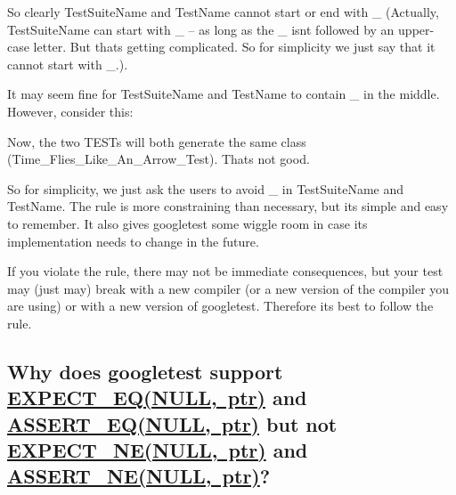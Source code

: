 So clearly {\ttfamily Test\+Suite\+Name} and {\ttfamily Test\+Name} cannot start or end with {\ttfamily \+\_\+} (Actually, {\ttfamily Test\+Suite\+Name} can start with {\ttfamily \+\_\+} -- as long as the {\ttfamily \+\_\+} isn\textquotesingle{}t followed by an upper-\/case letter. But that\textquotesingle{}s getting complicated. So for simplicity we just say that it cannot start with {\ttfamily \+\_\+}.).

It may seem fine for {\ttfamily Test\+Suite\+Name} and {\ttfamily Test\+Name} to contain {\ttfamily \+\_\+} in the middle. However, consider this\+:


\begin{DoxyCode}{0}
\end{DoxyCode}


Now, the two {\ttfamily T\+E\+ST}s will both generate the same class ({\ttfamily Time\+\_\+\+Flies\+\_\+\+Like\+\_\+\+An\+\_\+\+Arrow\+\_\+\+Test}). That\textquotesingle{}s not good.

So for simplicity, we just ask the users to avoid {\ttfamily \+\_\+} in {\ttfamily Test\+Suite\+Name} and {\ttfamily Test\+Name}. The rule is more constraining than necessary, but it\textquotesingle{}s simple and easy to remember. It also gives googletest some wiggle room in case its implementation needs to change in the future.

If you violate the rule, there may not be immediate consequences, but your test may (just may) break with a new compiler (or a new version of the compiler you are using) or with a new version of googletest. Therefore it\textquotesingle{}s best to follow the rule.

\subsection*{Why does googletest support {\ttfamily \mbox{\hyperlink{_obj__test_2lib_2googletest-release-1_88_81_2googletest_2include_2gtest_2gtest_8h_a4159019abda84f5366acdb7604ff220a}{E\+X\+P\+E\+C\+T\+\_\+\+E\+Q(\+N\+U\+L\+L, ptr)}}} and {\ttfamily \mbox{\hyperlink{_obj__test_2lib_2googletest-release-1_88_81_2googletest_2include_2gtest_2gtest_8h_a1a6db8b1338ee7040329322b77779086}{A\+S\+S\+E\+R\+T\+\_\+\+E\+Q(\+N\+U\+L\+L, ptr)}}} but not {\ttfamily \mbox{\hyperlink{_obj__test_2lib_2googletest-release-1_88_81_2googletest_2include_2gtest_2gtest_8h_a6ae7443947f25abc58bfcfcfc56b0d75}{E\+X\+P\+E\+C\+T\+\_\+\+N\+E(\+N\+U\+L\+L, ptr)}}} and {\ttfamily \mbox{\hyperlink{_obj__test_2lib_2googletest-release-1_88_81_2googletest_2include_2gtest_2gtest_8h_aa866c8dece57912e6f51495ed3e8d8d5}{A\+S\+S\+E\+R\+T\+\_\+\+N\+E(\+N\+U\+L\+L, ptr)}}}?}


